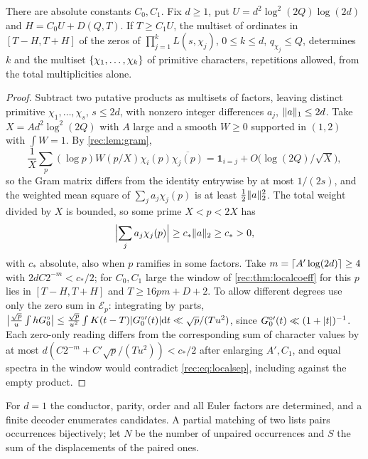 \begin{theorem}\label{rec:thm:localid}
There are absolute constants $C_0,C_1$. Fix $d\ge1$, put $U=d^2\log^2(2Q)\log(2d)$ and
$H=C_0U+D(Q,T)$. If $T\ge C_1U$, the multiset of ordinates in $[T-H,T+H]$ of the zeros of
$\prod_{j=1}^kL(s,\chi_j)$, $0\le k\le d$, $q_{\chi_j}\le Q$, determines $k$ and the multiset
$\{\chi_1,\dots,\chi_k\}$ of primitive characters, repetitions allowed, from the total
multiplicities alone.
\end{theorem}

\begin{proof}
Subtract two putative products as multisets of factors, leaving distinct primitive
$\chi_1,\dots,\chi_s$, $s\le2d$, with nonzero integer differences $a_j$, $\lVert a\rVert_1\le2d$. Take $X=Ad^2\log^2(2Q)$
with $A$ large and a smooth $W\ge0$ supported in $(1,2)$ with $\int W=1$. By \cref{rec:lem:gram},
\[
 \frac1X\sum_p(\log p)W(p/X)\chi_i(p)\overline{\chi_j(p)}=\mathbf 1_{i=j}+O\bigl(\log(2Q)/\sqrt X\bigr),
\]
so the Gram matrix
differs from the identity entrywise by at most $1/(2s)$, and the weighted mean square of
$\sum_ja_j\chi_j(p)$ is at least $\tfrac12\lVert a\rVert_2^2$. The total weight divided by $X$ is bounded, so some prime $X<p<2X$ has
\begin{equation}\label{rec:eq:localsep}
 \Bigl\lvert\sum_ja_j\chi_j(p)\Bigr\rvert\ge c_*\lVert a\rVert_2\ge c_*>0,
\end{equation}
with $c_*$ absolute, also when $p$ ramifies in some factors. Take $m=\lceil A'\log(2d)\rceil\ge4$ with
$2dC2^{-m}<c_*/2$; for $C_0,C_1$ large the window of \cref{rec:thm:localcoeff} for this $p$ lies in
$[T-H,T+H]$ and $T\ge16pm+D+2$. To allow different degrees use only the zero sum in $\mathcal E_p$:
integrating by parts, $\bigl\lvert\frac{\sqrt p}u\int hG_0^\circ\bigr\rvert\le\frac{\sqrt p}{u^2}\int K(t-T)\lvert G_0^{\circ\prime}(t)\rvert\mathrm{d} t
\ll\sqrt p/(Tu^2)$, since $G_0^{\circ\prime}(t)\ll(1+\lvert t\rvert)^{-1}$. Each zero-only reading differs from the
corresponding sum of character values by at most $d(C2^{-m}+C'\sqrt p/(Tu^2))<c_*/2$ after enlarging
$A',C_1$, and equal spectra in the window would contradict \eqref{rec:eq:localsep}, including against
the empty product.
\end{proof}

For $d=1$ the conductor, parity, order and all Euler factors are determined, and a finite decoder
enumerates candidates. A partial matching of two lists pairs occurrences bijectively; let $N$ be
the number of unpaired occurrences and $S$ the sum of the displacements of the paired ones.

